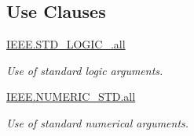 \subsection*{Use Clauses}
 \begin{DoxyCompactItemize}
\item 
\hypertarget{classbutton__control_a68c233289eaf7d2601307bdd93b4c299}{\hyperlink{classbutton__control_a68c233289eaf7d2601307bdd93b4c299}{I\-E\-E\-E.\-S\-T\-D\-\_\-\-L\-O\-G\-I\-C\-\_.\-all}   }\label{classbutton__control_a68c233289eaf7d2601307bdd93b4c299}

\begin{DoxyCompactList}\small\item\em Use of standard logic arguments. \end{DoxyCompactList}\item 
\hypertarget{classbutton__control_a7c135c43c66ccd7f22abe5f6211788a5}{\hyperlink{classbutton__control_a7c135c43c66ccd7f22abe5f6211788a5}{I\-E\-E\-E.\-N\-U\-M\-E\-R\-I\-C\-\_\-\-S\-T\-D.\-all}   }\label{classbutton__control_a7c135c43c66ccd7f22abe5f6211788a5}

\begin{DoxyCompactList}\small\item\em Use of standard numerical arguments. \end{DoxyCompactList}\end{DoxyCompactItemize}
